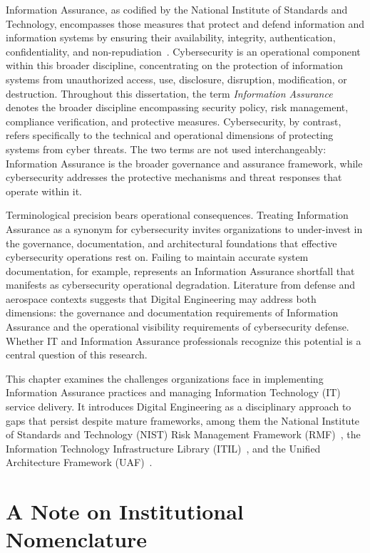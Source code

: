 Information Assurance, as codified by the National Institute of Standards and Technology, encompasses those measures that protect and defend information and information systems by ensuring their availability, integrity, authentication, confidentiality, and non-repudiation~\parencite{Force_2020}. Cybersecurity is an operational component within this broader discipline, concentrating on the protection of information systems from unauthorized access, use, disclosure, disruption, modification, or destruction. Throughout this dissertation, the term \textit{Information Assurance} denotes the broader discipline encompassing security policy, risk management, compliance verification, and protective measures. Cybersecurity, by contrast, refers specifically to the technical and operational dimensions of protecting systems from cyber threats. The two terms are not used interchangeably: Information Assurance is the broader governance and assurance framework, while cybersecurity addresses the protective mechanisms and threat responses that operate within it.

Terminological precision bears operational consequences. Treating Information Assurance as a synonym for cybersecurity invites organizations to under-invest in the governance, documentation, and architectural foundations that effective cybersecurity operations rest on. Failing to maintain accurate system documentation, for example, represents an Information Assurance shortfall that manifests as cybersecurity operational degradation. Literature from defense and aerospace contexts suggests that Digital Engineering may address both dimensions: the governance and documentation requirements of Information Assurance and the operational visibility requirements of cybersecurity defense. Whether IT and Information Assurance professionals recognize this potential is a central question of this research.

This chapter examines the challenges organizations face in implementing Information Assurance practices and managing Information Technology (IT) service delivery. It introduces Digital Engineering as a disciplinary approach to gaps that persist despite mature frameworks, among them the National Institute of Standards and Technology (NIST) Risk Management Framework (RMF)~\parencite{Force_2020}, the Information Technology Infrastructure Library (ITIL)~\parencite{Cannon_AXELOS_2013}, and the Unified Architecture Framework (UAF)~\parencite{OMG_UAF_2022}.

\section{A Note on Institutional Nomenclature}

